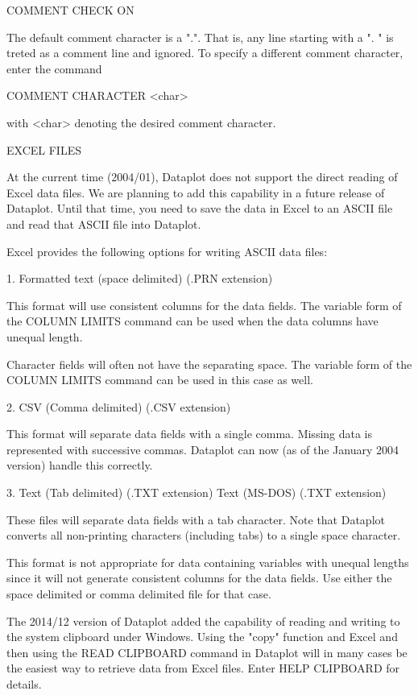     COMMENT CHECK ON

The default comment character is a ".".  That is, any line starting
with a ". " is treted as a comment line and ignored.  To specify
a different comment character, enter the command

    COMMENT CHARACTER  <char>

with <char> denoting the desired comment character.


EXCEL FILES

At the current time (2004/01), Dataplot does not support the
direct reading of Excel data files.  We are planning to add
this capability in a future release of Dataplot.  Until that
time, you need to save the data in Excel to an ASCII file and
read that ASCII file into Dataplot.
 
Excel provides the following options for writing ASCII data
files:

  1. Formatted text (space delimited) (.PRN extension)

     This format will use consistent columns for the data fields.
     The variable form of the COLUMN LIMITS command can be used
     when the data columns have unequal length.

     Character fields will often not have the separating space.  The
     variable form of the COLUMN LIMITS command can be used in this
     case as well.

  2. CSV (Comma delimited) (.CSV extension)

     This format will separate data fields with a single comma.
     Missing data is represented with successive commas.  Dataplot
     can now (as of the January 2004 version) handle this correctly.

  3. Text (Tab delimited) (.TXT extension)
     Text (MS-DOS) (.TXT extension)

     These files will separate data fields with a tab character.
     Note that Dataplot converts all non-printing characters
     (including tabs) to a single space character.

     This format is not appropriate for data containing variables
     with unequal lengths since it will not generate consistent
     columns for the data fields.  Use either the space delimited
     or comma delimited file for that case.

The 2014/12 version of Dataplot added the capability of reading
and writing to the system clipboard under Windows.  Using the
"copy" function and Excel and then using the READ CLIPBOARD command
in Dataplot will in many cases be the easiest way to retrieve
data from Excel files.  Enter HELP CLIPBOARD for details.

